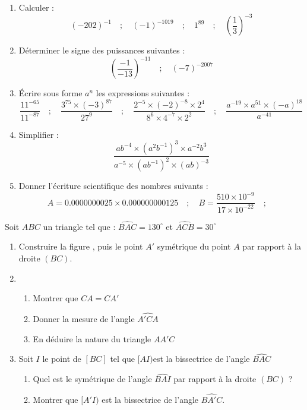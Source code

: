 \documentclass[a4paper,12pt]{article}
\begin{document}
\newpage
\begin{exo}
\begin{enumerate}
\item Calculer : 
\[(- 202)^{-1} \quad; \quad (-1)^{-1019} \quad; \quad 1^{89} \quad; \quad (\dfrac{1}{3})^{-3}\]
\item Déterminer le signe des puissances suivantes :
\[ (\dfrac{-1}{-13})^{-11} \quad; \quad 
	(-7)^{-2007}
\] 
\item Écrire sous forme $a^{n}$ les expressions suivantes :
\[\dfrac{11^{-65}}{11^{-87}}\quad; \quad
	\dfrac{3^{75}\times (-3)^{87}}{27^{9}}\quad; \quad
	\dfrac{2^{-5}\times (-2)^{-8}\times 2^{4}}{8^{6}\times 4^{-7}\times 2^{2}}\quad; \quad
\dfrac{a^{-19}\times a^{51}\times (-a)^{18}}{a^{-41}}
\]
\item Simplifier : 
\[
\dfrac{ab^{-4}\times (a^{2}b^{-1})^{3}\times a^{-2}b^{3}}{a^{-5}\times (ab^{-1})^{2}\times (ab)^{-3}}
\]
\item Donner l'écriture scientifique des nombres suivants :
\[
	A=0.0000000025\times 0.000000000125\quad; \quad
	B=\dfrac{510\times 10^{-9}}{17\times 10^{-22}}\quad; \quad
\]
\end{enumerate}
\end{exo}

\begin{exo}
Soit $ABC$ un triangle tel que : $\widehat{BAC}=130^{\circ}$ et $\widehat{ACB}=30^{\circ}$
\begin{enumerate}
\item Construire la figure , puis le point $A'$ symétrique du point $A$ par rapport à la droite $(BC)$.
\item
	\begin{enumerate}
	\item Montrer que $CA=CA'$
	\item Donner la mesure de l'angle $\widehat{A'CA}$
	\item En déduire la nature du triangle $AA'C$
	\end{enumerate}
\item Soit $I$ le point de $[BC]$ tel que $[AI)$est  la bissectrice de l'angle $\widehat{BAC}$
		\begin{enumerate}
		\item Quel est le symétrique de l'angle $\widehat{BAI}$ par rapport à la droite $(BC)$ ?
		\item Montrer que $[A'I)$ est la bissectrice de l'angle $\widehat{BA'C}$.
		\end{enumerate}	
\end{enumerate}
\end{exo}
\end{document}
